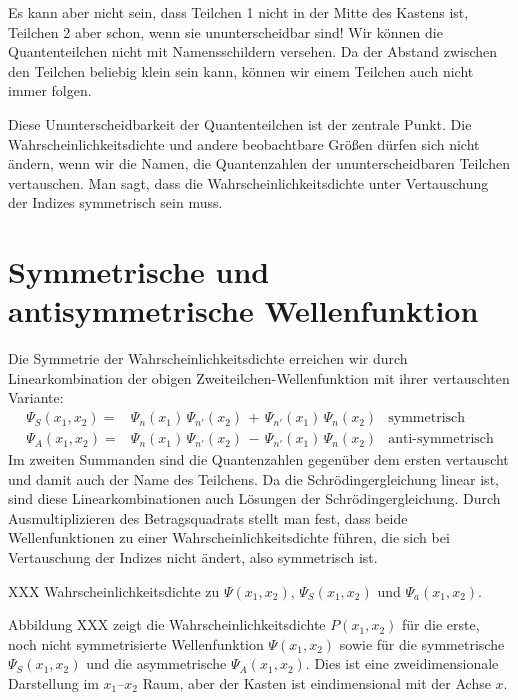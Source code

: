 Es kann aber nicht sein, dass Teilchen 1 nicht in der Mitte des Kastens ist, Teilchen 2 aber schon, wenn sie ununterscheidbar sind! Wir können die Quantenteilchen nicht mit Namensschildern versehen. Da der Abstand zwischen den Teilchen beliebig klein sein kann, können wir einem Teilchen auch nicht immer folgen.

Diese Ununterscheidbarkeit der Quantenteilchen ist der zentrale Punkt. Die Wahrscheinlichkeitsdichte und andere beobachtbare Größen dürfen sich nicht ändern, wenn wir die Namen, die Quantenzahlen der ununterscheidbaren Teilchen vertauschen. Man sagt, dass die Wahrscheinlichkeitsdichte unter Vertauschung der Indizes symmetrisch sein muss.

\section{Symmetrische und antisymmetrische Wellenfunktion}

Die Symmetrie der Wahrscheinlichkeitsdichte erreichen wir durch Linearkombination der obigen Zweiteilchen-Wellenfunktion mit ihrer vertauschten Variante:
\begin{align}
    \Psi_S(x_1, x_2) = & \Psi_{n}(x_1) \, \Psi_{n'}(x_2) \, + \, \Psi_{n'}(x_1) \, \Psi_{n}(x_2) & \text{symmetrisch}
    \label{eq:6_sym_WF} \\
    \Psi_A(x_1, x_2) = & \Psi_{n}(x_1) \, \Psi_{n'}(x_2) \, - \, \Psi_{n'}(x_1) \, \Psi_{n}(x_2) & \text{anti-symmetrisch} 
    \label{eq:6_asym_WF} 
\end{align}
Im zweiten Summanden sind die Quantenzahlen gegenüber dem ersten vertauscht und damit auch der Name des Teilchens. Da die Schrödingergleichung linear ist, sind diese Linearkombinationen auch Lösungen der Schrödingergleichung.
Durch Ausmultiplizieren des Betragsquadrats stellt man fest, dass beide Wellenfunktionen zu einer Wahrscheinlichkeitsdichte führen, die sich bei Vertauschung der Indizes nicht ändert, also symmetrisch ist.


\begin{marginfigure}
    \caption{XXX  Wahrscheinlichkeitsdichte zu $ \Psi(x_1, x_2)$,  $ \Psi_S(x_1, x_2)$ und  $ \Psi_a(x_1, x_2)$.}
\end{marginfigure}

Abbildung XXX zeigt die Wahrscheinlichkeitsdichte $ P(x_1, x_2) $ für die erste, noch nicht symmetrisierte Wellenfunktion $ \Psi(x_1, x_2)$ sowie für die symmetrische $ \Psi_S(x_1, x_2)$ und die asymmetrische $ \Psi_A(x_1, x_2)$. Dies ist eine zweidimensionale Darstellung im $x_1$--$x_2$ Raum, aber der Kasten ist eindimensional mit der Achse $x$.


